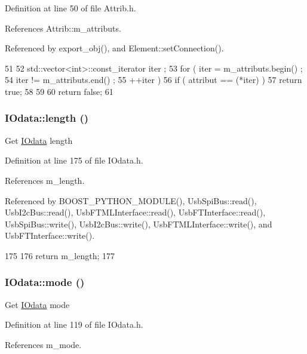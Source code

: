 Definition at line 50 of file Attrib.h.

References Attrib::m\_\-attributs.

Referenced by export\_\-obj(), and Element::setConnection().


\begin{DoxyCode}
51   {
52     std::vector<int>::const_iterator iter ;
53     for ( iter  = m_attributs.begin() ;
54           iter != m_attributs.end()   ;
55           ++iter ) {
56       if ( attribut == (*iter) ) {
57         return true;
58       }
59     }
60     return false;
61   }
\end{DoxyCode}
\hypertarget{classIOdata_abb40e71ce0290832a24857b4a1e7b1a3}{
\subsubsection[{length}]{ IOdata::length ()}}
\label{classIOdata_abb40e71ce0290832a24857b4a1e7b1a3}
Get \hyperlink{classIOdata}{IOdata} length 

Definition at line 175 of file IOdata.h.

References m\_\-length.

Referenced by BOOST\_\-PYTHON\_\-MODULE(), UsbSpiBus::read(), UsbI2cBus::read(), UsbFTMLInterface::read(), UsbFTInterface::read(), UsbSpiBus::write(), UsbI2cBus::write(), UsbFTMLInterface::write(), and UsbFTInterface::write().


\begin{DoxyCode}
175               {
176     return m_length;
177   }
\end{DoxyCode}
\hypertarget{classIOdata_aae2073c3bc6bc9f620dc0fca7fccc9a7}{
\subsubsection[{mode}]{ IOdata::mode ()}}
\label{classIOdata_aae2073c3bc6bc9f620dc0fca7fccc9a7}
Get \hyperlink{classIOdata}{IOdata} mode 

Definition at line 119 of file IOdata.h.

References m\_\-mode.

